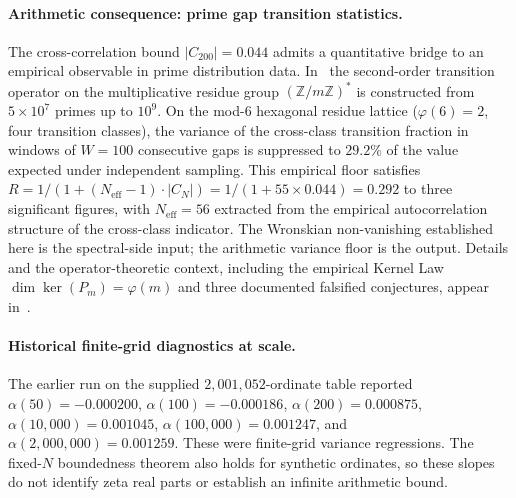 \documentclass[11pt,a4paper]{article}
\theoremstyle{plain}
\theoremstyle{definition}
\theoremstyle{remark}
\begin{document}
\paragraph{Arithmetic consequence: prime gap transition statistics.}
The cross-correlation bound $|C_{200}| = 0.044$ admits a quantitative bridge
to an empirical observable in prime distribution data. In~\cite{WallaceN3}
the second-order transition operator on the multiplicative residue
group $(\mathbb{Z}/m\mathbb{Z})^*$ is constructed from $5 \times 10^7$
primes up to $10^9$. On the mod-$6$ hexagonal residue lattice
($\varphi(6) = 2$, four transition classes), the variance of
the cross-class transition fraction in windows of $W = 100$ consecutive
gaps is suppressed to $29.2\%$ of the value expected under independent
sampling. This empirical floor satisfies
$R = 1/(1 + (N_{\mathrm{eff}}-1)\cdot|C_N|) = 1/(1 + 55 \times 0.044) = 0.292$
to three significant figures, with $N_{\mathrm{eff}} = 56$ extracted
from the empirical autocorrelation structure of the cross-class indicator.
The Wronskian non-vanishing established here is the spectral-side input;
the arithmetic variance floor is the output. Details and the operator-theoretic
context, including the empirical Kernel Law
$\dim \ker(P_m) = \varphi(m)$ and three documented falsified
conjectures, appear in~\cite{WallaceN3}.

\paragraph{Historical finite-grid diagnostics at scale.}
The earlier run on the supplied $2{,}001{,}052$-ordinate table reported
$\alpha(50)=-0.000200$, $\alpha(100)= -0.000186$,
$\alpha(200)=0.000875$, $\alpha(10{,}000)=0.001045$,
$\alpha(100{,}000)=0.001247$, and
$\alpha(2{,}000{,}000)=0.001259$. These were finite-grid variance
regressions. The fixed-$N$ boundedness theorem also holds for synthetic
ordinates, so these slopes do not identify zeta real parts or establish
an infinite arithmetic bound.
\end{document}
